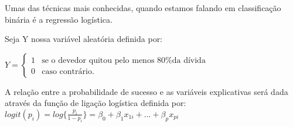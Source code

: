 
Umas das técnicas mais conhecidas, quando estamos falando em classificação binária é a regressão logística.

Seja Y nossa variável aleatória definida por:

\enspace

$
Y = 
\begin{cases}

             1 & \mbox{se o devedor quitou pelo menos 80\% da dívida}\\

             0 & \mbox{caso contrário.}

       \end{cases}
$

\hspace{2cm}

A relação entre a probabilidade de sucesso  e as variáveis explicativas será dada através da função de ligação logística definida por:
$ logit(p_i) = log\{\frac{p_i}{1 - p_i}\} = \beta_0 + \beta_1 x_{1i} + ... + \beta_p x_{pi} $
